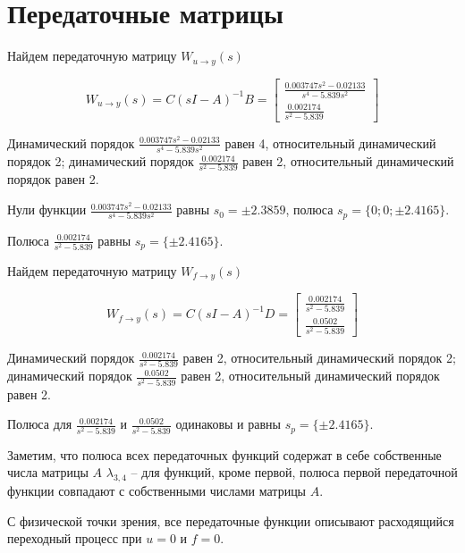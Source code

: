 \section{Передаточные матрицы}

Найдем передаточную матрицу $W_{u \to y}(s)$

\begin{equation}
    W_{u \to y} (s) = C \left(sI-A  \right)^{-1}B = \begin{bmatrix}
        \frac{0.003747s^2 -0.02133}{s^4-5.839s^2}\\[2ex]
        \frac{0.002174}{s^2-5.839}
    \end{bmatrix}
\end{equation}

Динамический порядок $ \frac{0.003747s^2 -0.02133}{s^4-5.839s^2}$ равен 4, относительный динамический порядок 2; динамический порядок $\frac{0.002174}{s^2-5.839}$ равен 2, относительный динамический порядок равен 2.

Нули функции $\frac{0.003747s^2 -0.02133}{s^4-5.839s^2}$ равны $s_0 =\pm 2.3859$, полюса $s_p = \{ 0; 0; \pm 2.4165 \}$.

Полюса $\frac{0.002174}{s^2-5.839}$ равны $s_p = \{ \pm 2.4165 \}$.

Найдем передаточную матрицу $W_{f \to y}(s)$

\begin{equation}
    W_{f \to y} (s) = C \left(sI-A  \right)^{-1}D = \begin{bmatrix}
        \frac{0.002174}{s^2-5.839}\\[2ex]
        \frac{0.0502}{s^2-5.839}
    \end{bmatrix}
\end{equation}

Динамический порядок $ \frac{0.002174}{s^2-5.839}$ равен 2, относительный динамический порядок 2; динамический порядок $\frac{0.0502}{s^2-5.839}$ равен 2, относительный динамический порядок равен 2.

Полюса для  $ \frac{0.002174}{s^2-5.839}$ и $\frac{0.0502}{s^2-5.839}$ одинаковы и равны $s_p = \{ \pm 2.4165 \}$.

Заметим, что полюса всех передаточных функций содержат в себе собственные числа матрицы $A$ $\lambda_{3,4}$ -- для функций, кроме первой, полюса первой передаточной функции совпадают с собственными числами матрицы $A$.

С физической точки зрения, все передаточные функции описывают расходящийся переходный процесс при $u=0$ и $f=0$.



